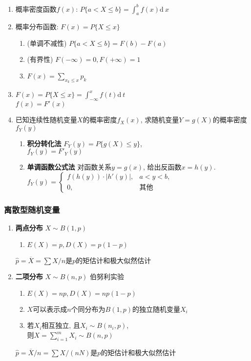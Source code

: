 \documentclass[10pt,a4paper,nofonts]{ctexart}
\renewcommand{\d}{{\mathrm{d}\:\!}}
\begin{document}
\begin{multicols}{2}
\begin{enumerate}
\item 概率密度函数$f(x)$: $P\{a<X\le b\}=\int_a^b f(x)\d x$
\item 概率分布函数: $F(x)=P\{X\le x\}$
\begin{enumerate}
\item (单调不减性) $P\{a<X\le b\}=F(b)-F(a)$
\item (有界性) $F(-\infty)=0, F(+\infty)=1$
\item $F(x)=\sum_{x_k\le x}p_k$
\end{enumerate}
\item $F(x)=P\{X\le x\}=\int_{-\infty}^{x}f(t)\d t$\\$f(x)=F'(x)$

\item 已知连续性随机变量$X$的概率密度$f_X(x)$, 求随机变量$Y=g(X)$的概率密度$f_Y(y)$
\begin{enumerate}
\item {\bf 积分转化法} $F_Y(y)=P\{g(X)\le y\}$,\\$f_Y(y)=F'_Y(y)$
\item {\bf 单调函数公式法} 对函数关系$y=g(x)$, 给出反函数$x=h(y)$. \\
$f_Y(y)=\left\{\begin{array}{cl}
f(h(y))\cdot|h'(y)|, & a< y< b,\\
0, & \text{其他}
\end{array}\right.$
\end{enumerate}

\end{enumerate}

\subsubsection*{离散型随机变量}

\begin{enumerate}
\item {\bf 两点分布} $X\sim B(1,p)$\\
\begin{enumerate}[label={\sf 性质\arabic*}]
\item $E(X)=p, D(X)=p(1-p)$
\end{enumerate}
$\hat{p}=\overline{X}={\sum{X}}/{n}$是$p$的矩估计和极大似然估计

\item {\bf 二项分布} $X\sim B(n,p)$ 伯努利实验\\
\begin{enumerate}[label={\sf 性质\arabic*}]
\item $E(X)=np, D(X)=np(1-p)$
\item $X$可以表示成$n$个同分布为$B(1,p)$的独立随机变量$X_i$
\item 若$X_i$相互独立, 且$X_i\sim B(n_i,p)$, \\则$X=\sum_{i=1}^{m}X_i\sim B(n,p)$
\end{enumerate}
$\hat{p}={\overline{X}}/{n}={\sum{X}}/{(nN)}$是$p$的矩估计和极大似然估计


\end{enumerate}
\end{multicols}
\end{document}
